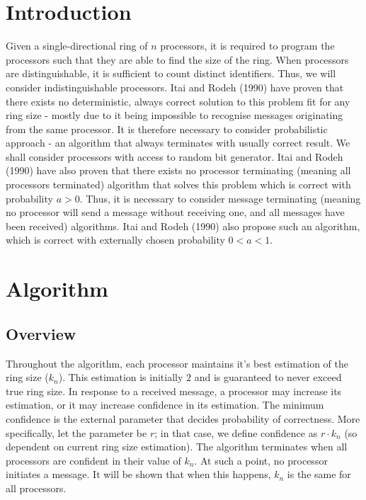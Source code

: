 \documentclass{article}
\begin{document}
\section{Introduction}
Given a single-directional ring of $n$ processors, it is required to program the processors such that they are able to find the size of the ring. When processors are distinguishable, it is sufficient to count distinct identifiers. Thus, we will consider indistinguishable processors. Itai and Rodeh (1990) \cite{ItaiRodeh1990} have proven that there exists no deterministic, always correct solution to this problem fit for any ring size - mostly due to it being impossible to recognise messages originating from the same processor. It is therefore necessary to consider probabilistic approach - an algorithm that always terminates with usually correct result. We shall consider processors with access to random bit generator. Itai and Rodeh (1990) have also proven that there exists no processor terminating (meaning all processors terminated) algorithm that solves this problem which is correct with probability $a > 0$. Thus, it is necessary to consider message terminating (meaning no processor will send a message without receiving one, and all messages have been received) algorithms. Itai and Rodeh (1990) also propose such an algorithm, which is correct with externally chosen probability $0 < a < 1$.

\section{Algorithm}
\subsection{Overview}
Throughout the algorithm, each processor maintains it's best estimation of the ring size ($k_n$). This estimation is initially $2$ and is guaranteed to never exceed true ring size. In response to a received message, a processor may increase its estimation, or it may increase confidence in its estimation. The minimum confidence is the external parameter that decides probability of correctness. More specifically, let the parameter be $r$; in that case, we define confidence as $r \cdot k_n$ (so dependent on current ring size estimation). The algorithm terminates when all processors are confident in their value of $k_n$. At such a point, no processor initiates a message. It will be shown that when this happens, $k_n$ is the same for all processors.
\end{document}
